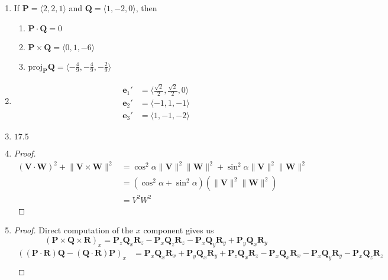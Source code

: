 \documentclass[a4paper]{article}
\newcommand{\vect}{\mathbf}
\begin{document}
\begin{enumerate}
	\item If $\vect{P} = \langle 2,2,1 \rangle$ and $\vect{Q} = \langle 1,-2,0 \rangle$, then
	\begin{enumerate}
		\item $\vect{P} \cdot \vect{Q} = 0$
		\item $\vect{P} \times \vect{Q} = \langle 0,1,-6 \rangle$
		\item ${\text{proj}}_{\vect{P}}\vect{Q} = \langle -\frac{4}{9}, -\frac{4}{9}, -\frac{2}{9} \rangle$
	\end{enumerate}
	\item
		\begin{align}
			\mathbf{e}_1' &= \langle \frac{\sqrt{2}}{2}, \frac{\sqrt{2}}{2}, 0 \rangle\\
			\mathbf{e}_2' &= \langle -1, 1, -1 \rangle\\
			\mathbf{e}_3' &= \langle 1, -1, -2 \rangle
		\end{align}
	\item $17.5$
	\item
		\begin{proof}
			\begin{align*}
				(\vect{V} \cdot \vect{W})^2 + \lVert \vect{V} \times \vect{W} \rVert^2
				&= \cos^2 \alpha \lVert \vect{V} \rVert^2 \lVert \vect{W} \rVert^2
				+ \sin^2 \alpha \lVert \vect{V} \rVert^2 \lVert \vect{W} \rVert^2\\
				&= (\cos^2 \alpha + \sin^2 \alpha)(\lVert \vect{V} \rVert^2 \lVert \vect{W} \rVert^2)\\
				&= V^2W^2
			\end{align*}
		\end{proof}
	\item
		\begin{proof}
			Direct computation of the $x$ component gives us
			\begin{equation*}
				(\vect{P} \times \vect{Q} \times \vect{R})_x = \vect{P}_z \vect{Q}_x \vect{R}_z - \vect{P}_x \vect{Q}_z \vect{R}_z - \vect{P}_x \vect{Q}_y \vect{R}_y + \vect{P}_y \vect{Q}_x \vect{R}_y
			\end{equation*}
			\begin{align*}
				((\vect{P} \cdot \vect{R}) \vect{Q} - (\vect{Q} \cdot \vect{R}) \vect{P})_x
				&= \vect{P}_x \vect{Q}_x \vect{R}_x + \vect{P}_y \vect{Q}_x \vect{R}_y + \vect{P}_z \vect{Q}_x \vect{R}_z - \vect{P}_x \vect{Q}_x \vect{R}_x - \vect{P}_x \vect{Q}_y \vect{R}_y - \vect{P}_x \vect{Q}_z \vect{R}_z\\

\end{align*}
\end{proof}
\end{enumerate}
\end{document}
